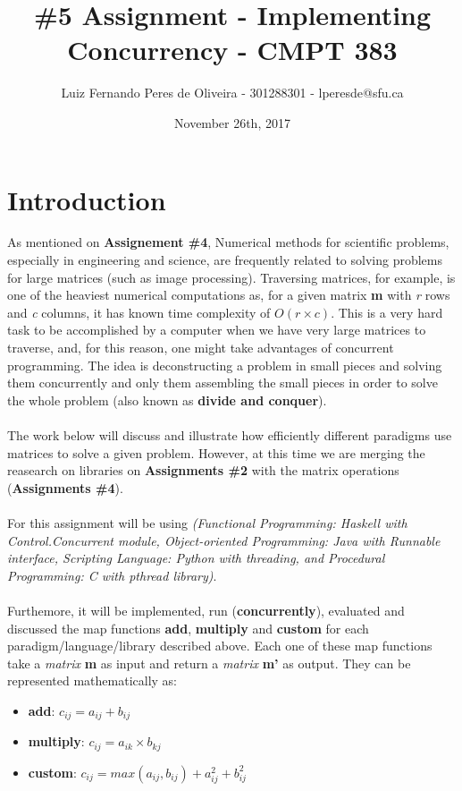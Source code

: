 \documentclass[conference]{IEEEtran}
\title{\#5 Assignment - Implementing Concurrency - CMPT 383}
\author{Luiz Fernando Peres de Oliveira - 301288301 - lperesde@sfu.ca}
\date{November 26th, 2017}
\begin{document}
\maketitle
\section{Introduction}
As mentioned on \textbf{Assignement \#4}, Numerical methods for scientific problems, especially in engineering and science, are frequently related to solving problems for large matrices (such as image processing). Traversing matrices, for example, is one of the heaviest numerical computations as, for a given matrix \textbf{m} with \textit{r} rows and \textit{c} columns, it has known time complexity of $O(r\times c)$. This is a very hard task to be accomplished by a computer when we have very large matrices to traverse, and, for this reason, one might take advantages of concurrent programming. The idea is deconstructing a problem in small pieces and solving them concurrently and only them assembling the small pieces in order to solve the whole problem (also known as \textbf{divide and conquer}).
\\\\
The work below will discuss and illustrate how efficiently different paradigms use matrices to solve a given problem. However, at this time we are merging the reasearch on libraries on \textbf{Assignments \#2} with the matrix operations (\textbf{Assignments \#4}).
\\\\
For this assignment will be using \textit{(Functional Programming: Haskell with \textit{Control.Concurrent module}, Object-oriented Programming: Java with \textit{Runnable interface}, Scripting Language: Python with \textit{threading}, and Procedural Programming: C with \textit{pthread library})}.
\\\\
Furthemore, it will be implemented, run (\textbf{concurrently}), evaluated and discussed the map functions \textbf{add}, \textbf{multiply} and \textbf{custom} for each paradigm/language/library described above. Each one of these map functions take a \textit{matrix} \textbf{m} as input and return a \textit{matrix} \textbf{m'} as output. They can be represented mathematically as:

\begin{itemize}
	\item \textbf{add}: $c_{ij} = a_{ij} + b_{ij}$
	\item \textbf{multiply}: $c_{ij} = a_{ik} \times b_{kj}$
	\item \textbf{custom}: $c_{ij} = max(a_{ij}, b_{ij}) + a_{ij}^2 + b_{ij}^2$
\end{itemize}
\end{document}
